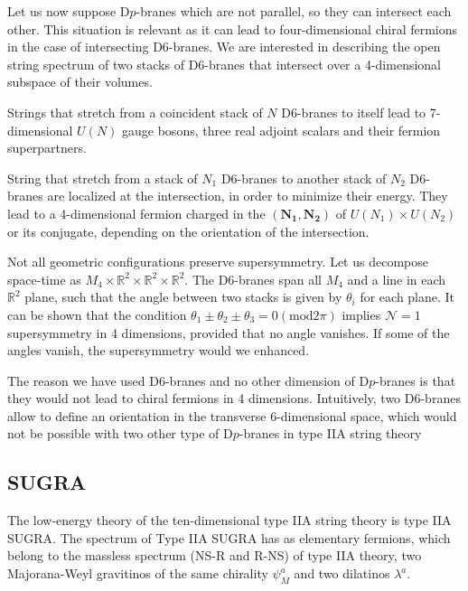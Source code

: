 Let us now suppose D$p$-branes which are not parallel, so they can intersect each other.
This situation is relevant as it can lead to four-dimensional chiral fermions in the case of intersecting D6-branes.
We are interested in describing the open string spectrum of two stacks of D$6$-branes that intersect over a 4-dimensional subspace of their volumes.

Strings that stretch from a coincident stack of $N$ D6-branes to itself lead to 7-dimensional $U(N)$ gauge bosons, three real adjoint scalars and their fermion superpartners.

String that stretch from a stack of $N_1$ D6-branes to another stack of $N_2$ D6-branes are localized at the intersection,
in order to minimize their energy. 
They lead to a 4-dimensional fermion charged in the $(\mathbf{N_1},\mathbf{N_2})$ of $U(N_1)\times U(N_2)$ or its conjugate, depending on the orientation
of the intersection.

Not all geometric configurations preserve supersymmetry. 
Let us decompose space-time as $M_4 \times \mathbb R^2 \times \mathbb R^2 \times \mathbb R^2 $.
The D6-branes span all $M_4$ and a line in each $\mathbb R^2$ plane, such that the angle between
two stacks is given by $\theta_i$ for each plane.
It can be shown that the condition $\theta_1\pm\theta_2\pm\theta_3=0 (\mathrm{mod} 2\pi)$ implies $\mathcal N=1$ 
supersymmetry in 4 dimensions, provided that no angle vanishes.
If some of the angles vanish, the supersymmetry would we enhanced.

The reason we have used D6-branes and no other dimension of D$p$-branes is that they would not lead to chiral fermions in 4 dimensions.
Intuitively, two D6-branes allow to define an orientation in the transverse 6-dimensional space, which would not be possible
with two other type of D$p$-branes in type IIA string theory


%


\subsection{SUGRA}
 
The low-energy theory of the ten-dimensional type IIA string theory is type IIA SUGRA.
The spectrum of Type IIA SUGRA has as elementary fermions, which belong to the massless spectrum (NS-R and R-NS) of type IIA theory,
two Majorana-Weyl gravitinos of the same chirality $\psi_M^a$ and two dilatinos $\lambda^a$. 
